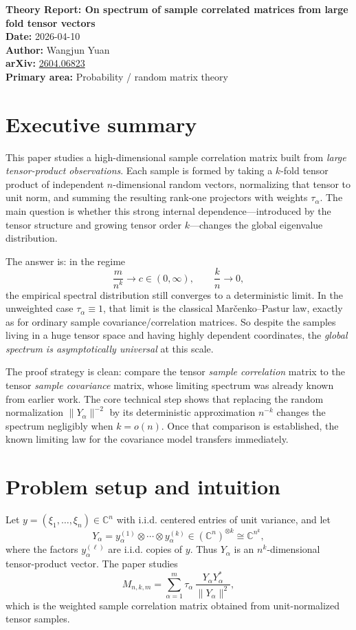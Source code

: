 \documentclass[11pt]{article}
\begin{document}
{\LARGE \textbf{Theory Report: On spectrum of sample correlated matrices from large fold tensor vectors}}\\[0.4em]
\textbf{Date:} 2026-04-10\\
\textbf{Author:} Wangjun Yuan\\
\textbf{arXiv:} \href{https://arxiv.org/abs/2604.06823}{2604.06823}\\
\textbf{Primary area:} Probability / random matrix theory

\section*{Executive summary}
This paper studies a high-dimensional sample correlation matrix built from \emph{large tensor-product observations}. Each sample is formed by taking a $k$-fold tensor product of independent $n$-dimensional random vectors, normalizing that tensor to unit norm, and summing the resulting rank-one projectors with weights $\tau_\alpha$. The main question is whether this strong internal dependence---introduced by the tensor structure and growing tensor order $k$---changes the global eigenvalue distribution.

The answer is: in the regime
\[
\frac{m}{n^k}\to c\in(0,\infty), \qquad \frac{k}{n}\to 0,
\]
the empirical spectral distribution still converges to a deterministic limit. In the unweighted case $\tau_\alpha\equiv 1$, that limit is the classical Mar\v cenko--Pastur law, exactly as for ordinary sample covariance/correlation matrices. So despite the samples living in a huge tensor space and having highly dependent coordinates, the \emph{global spectrum is asymptotically universal} at this scale.

The proof strategy is clean: compare the tensor \emph{sample correlation} matrix to the tensor \emph{sample covariance} matrix, whose limiting spectrum was already known from earlier work. The core technical step shows that replacing the random normalization $\|Y_\alpha\|^{-2}$ by its deterministic approximation $n^{-k}$ changes the spectrum negligibly when $k=o(n)$. Once that comparison is established, the known limiting law for the covariance model transfers immediately.

\section*{Problem setup and intuition}
Let $y=(\xi_1,\dots,\xi_n)\in\mathbb{C}^n$ with i.i.d. centered entries of unit variance, and let
\[
Y_\alpha = y_\alpha^{(1)}\otimes \cdots \otimes y_\alpha^{(k)} \in (\mathbb{C}^n)^{\otimes k}\cong \mathbb{C}^{n^k},
\]
where the factors $y_\alpha^{(\ell)}$ are i.i.d. copies of $y$. Thus $Y_\alpha$ is an $n^k$-dimensional tensor-product vector. The paper studies
\[
M_{n,k,m} = \sum_{\alpha=1}^m \tau_\alpha\, \frac{Y_\alpha Y_\alpha^*}{\|Y_\alpha\|^2},
\]
which is the weighted sample correlation matrix obtained from unit-normalized tensor samples.
\end{document}
